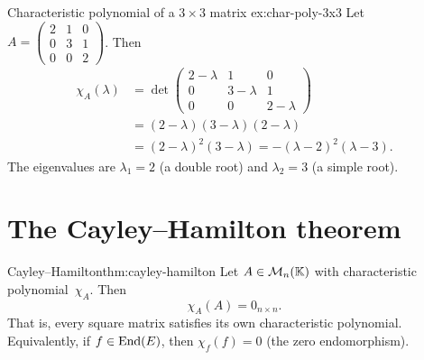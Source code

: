 \begin{example}{Characteristic polynomial of a $3\times 3$ matrix}%
{ex:char-poly-3x3}
Let $A = \begin{pmatrix} 2 & 1 & 0 \\ 0 & 3 & 1 \\ 0 & 0 & 2
\end{pmatrix}$.  Then
\begin{align*}
  \chi_A(\lambda) &= \det\begin{pmatrix} 2-\lambda & 1 & 0 \\
  0 & 3-\lambda & 1 \\ 0 & 0 & 2-\lambda \end{pmatrix} \\
  &= (2-\lambda)(3-\lambda)(2-\lambda) \\
  &= (2-\lambda)^2(3-\lambda)
  = -(\lambda-2)^2(\lambda-3).
\end{align*}
The eigenvalues are $\lambda_1 = 2$ (a double root) and $\lambda_2 = 3$
(a simple root).
\end{example}


\section{The Cayley--Hamilton theorem}\label{sec:cayley-hamilton}

\begin{theorem}{Cayley--Hamilton}{thm:cayley-hamilton}
Let $A\in\mathcal{M}_n({\mathbb{K}})$ with characteristic polynomial~$\chi_A$.  Then
\[
  \chi_A(A) = 0_{n\times n}.
\]
That is, every square matrix satisfies its own characteristic
polynomial.  Equivalently, if $f\in\operatorname{End}(E)$, then $\chi_f(f) = 0$
(the zero endomorphism).
\end{theorem}

